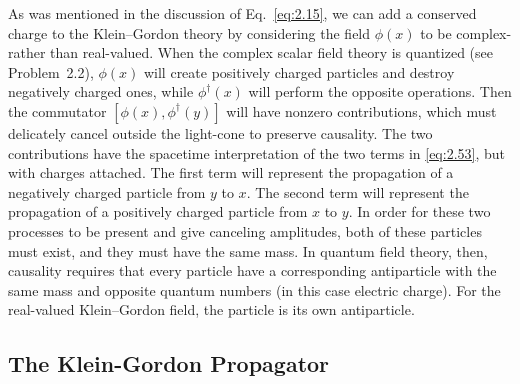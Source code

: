 As was mentioned in the discussion of Eq.~\eqref{eq:2.15}, we can add a
conserved charge to the Klein--Gordon theory by considering the field
$\phi(x)$ to be complex- rather than real-valued.  When the complex scalar
field theory is quantized (see Problem~2.2), $\phi(x)$ will create
positively charged particles and destroy negatively charged ones, while
$\phi^\dagger(x)$ will perform the opposite operations.  Then the
commutator $[\phi(x), \phi^\dagger(y)]$ will have nonzero contributions,
which must delicately cancel outside the light-cone to preserve causality.
The two contributions have the spacetime interpretation of the two terms
in \eqref{eq:2.53}, but with charges attached.  The first term will
represent the propagation of a negatively charged particle from $y$ to
$x$.  The second term will represent the propagation of a positively
charged particle from $x$ to $y$.  In order for these two processes to be
present and give canceling amplitudes, both of these particles must exist,
and they must have the same mass.  In quantum field theory, then, causality
requires that every particle have a corresponding antiparticle with the
same mass and opposite quantum numbers (in this case electric charge).  For
the real-valued Klein--Gordon field, the particle is its own antiparticle.

\subsection{The Klein-Gordon Propagator}

